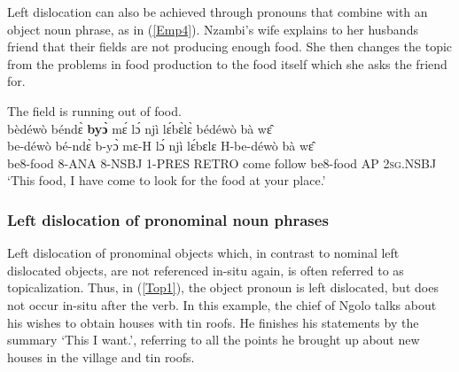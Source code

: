 



Left dislocation can also be achieved through pronouns that combine with an object noun phrase, 
as in (\ref{Emp4}). Nzambi's wife explains to her husbands friend that their fields are not producing enough food. She then changes the topic from the problems in food production to the food itself which she asks the friend for.

\begin{exe} 
\ex\label{Emp4} The field is running out of food.\\
  \glll bèdéwò béndɛ̀ {\bfseries byɔ̀} mɛ́ lɔ́ njì lɛ́bɛ̀lɛ̀ bédéwò bà wɛ̂\\
        be-déwò bé-ndɛ̀ b-yɔ̀ mɛ-H lɔ́ njì lɛ́bɛlɛ H-be-déwò bà wɛ̂\\
           be8-food 8-ANA 8-NSBJ 1-PRES RETRO come  follow be8-food AP 2\textsc{sg}.NSBJ\\
    \trans `This food, I have come to look for the food at your place.'
\end{exe}






\subsubsection{Left dislocation of pronominal noun phrases}
\label{sec:topical}

Left dislocation of pronominal objects which, in contrast to nominal left dislocated objects, are not referenced in-situ again, is often referred to as topicalization.
Thus, in (\ref{Top1}), the object pronoun is left dislocated, but does not occur in-situ after the verb. In this example, the chief of Ngolo talks about his wishes to obtain houses with tin roofs.  He finishes his statements by the summary `This I want.', referring to all the points he brought up about new houses in the village and tin roofs.

